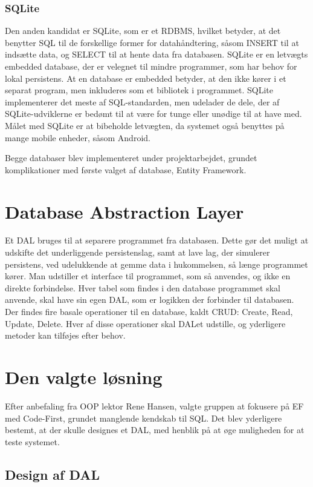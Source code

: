 \subsubsection*{SQLite}
Den anden kandidat er SQLite, som er et \ac{RDBMS}, hvilket betyder, at det benytter \ac{SQL} til de forskellige former for datahåndtering, såsom INSERT til at indsætte data, og SELECT til at hente data fra databasen.
SQLite er en letvægts embedded database, der er velegnet til mindre programmer, som har behov for lokal persistens.
At en database er embedded betyder, at den ikke kører i et separat program, men inkluderes som et bibliotek i programmet.
SQLite implementerer det meste af SQL-standarden, men udelader de dele, der af SQLite-udviklerne er bedømt til at være for tunge eller unødige til at have med.
Målet med SQLite er at bibeholde letvægten, da systemet også benyttes på mange mobile enheder, såsom Android.

Begge databaser blev implementeret under projektarbejdet, grundet komplikationer med første valget af database, Entity Framework. 


\section{Database Abstraction Layer}
Et \ac{DAL} bruges til at separere programmet fra databasen.
Dette gør det muligt at udskifte det underliggende persistenslag, samt at lave lag, der simulerer persistens, ved udelukkende at gemme data i hukommelsen, så længe programmet kører.
Man udstiller et interface til programmet, som så anvendes, og ikke en direkte forbindelse.
Hver tabel som findes i den database programmet skal anvende, skal have sin egen \ac{DAL}, som er logikken der forbinder til databasen.
Der findes fire basale operationer til en database, kaldt CRUD: Create, Read, Update, Delete. 
Hver af disse operationer skal DALet udstille, og yderligere metoder kan tilføjes efter behov.

\section{Den valgte løsning}

Efter anbefaling fra OOP lektor Rene Hansen, valgte gruppen at fokusere på \acl{EF} med Code-First, grundet manglende kendskab til \ac{SQL}.
Det blev yderligere bestemt, at der skulle designes et \ac{DAL}, med henblik på at øge muligheden for at teste systemet.

\subsection{Design af \ac{DAL}}

